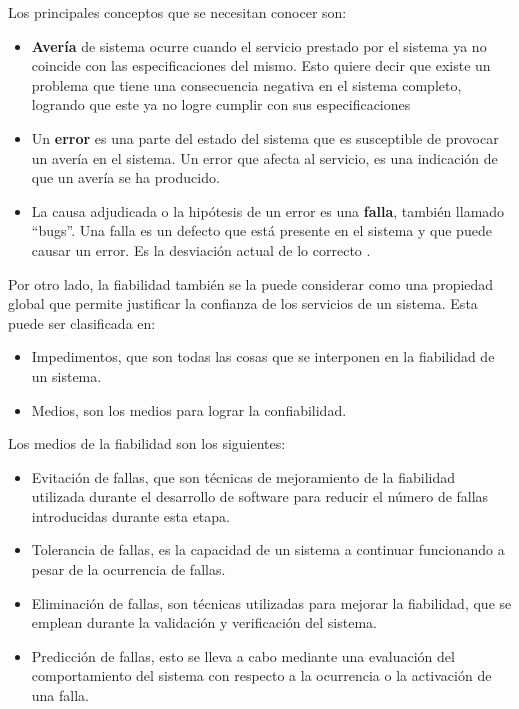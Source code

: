 Los principales conceptos que se necesitan conocer son:

\begin{itemize}
\item \textbf{Avería} de sistema ocurre cuando el servicio prestado por el sistema ya no coincide con las especificaciones del mismo. Esto quiere decir que existe un problema que tiene
una consecuencia negativa en el sistema completo, logrando que este ya no logre cumplir con sus
especificaciones
\item Un \textbf{error} es una parte del estado del sistema
que es susceptible de provocar un avería en el sistema. Un error que afecta al servicio, es una
indicación de que un avería se ha producido.
\item La causa adjudicada o la hipótesis de un error es una \textbf{falla}, también llamado ``bugs''. Una falla es un defecto que está presente en el sistema y que puede causar un error. Es la desviación actual de lo correcto \cite{Hanmer07}.
\end{itemize}

Por otro lado, la fiabilidad también se la puede considerar como una propiedad global que permite justificar la confianza de los servicios de un sistema. Esta puede ser clasificada en:
\begin{itemize}
\item Impedimentos, que son todas las cosas que se interponen en la fiabilidad de un sistema.
\item Medios, son los medios para lograr la confiabilidad. 
\end{itemize}

Los medios de la fiabilidad son los siguientes:
\begin{itemize}
\item Evitación de fallas, que son técnicas de mejoramiento de la fiabilidad utilizada durante el
desarrollo de software para reducir el número de fallas introducidas durante esta etapa.
\item Tolerancia de fallas, es la capacidad de un sistema a continuar funcionando a pesar de la ocurrencia de fallas.
\item Eliminación de fallas, son técnicas utilizadas para mejorar la fiabilidad, que se
emplean durante la validación y verificación del sistema.
\item Predicción de fallas, esto se lleva a cabo mediante una evaluación del comportamiento del
sistema con respecto a la ocurrencia o la activación de una falla. 
\end{itemize}

